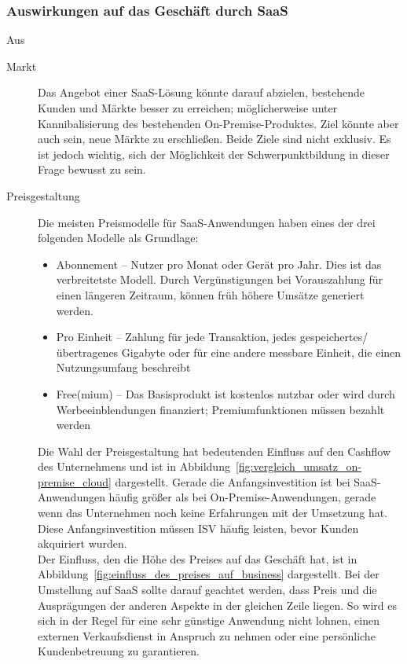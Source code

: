 \subsubsection{Auswirkungen auf das Geschäft durch SaaS}
Aus 
\begin{description}
	\item[Markt] Das Angebot einer SaaS-Lösung könnte darauf abzielen,
bestehende Kunden und Märkte besser zu erreichen; möglicherweise unter
Kannibalisierung des bestehenden On-Premise-Produktes. Ziel könnte aber auch
sein, neue Märkte zu erschließen. Beide Ziele sind nicht exklusiv. Es ist
jedoch wichtig, sich der Möglichkeit der Schwerpunktbildung in dieser Frage
bewusst zu sein.
	\item[Preisgestaltung] Die meisten Preismodelle für SaaS-Anwendungen
haben eines der drei folgenden Modelle als Grundlage:
	\begin{itemize}
		\item Abonnement -- Nutzer pro Monat oder Gerät pro Jahr. Dies
ist das verbreitetste Modell. Durch Vergünstigungen bei Vorauszahlung für einen
längeren Zeitraum, können früh höhere Umsätze generiert werden.
		\item Pro Einheit -- Zahlung für jede Transaktion, jedes
gespeichertes/übertragenes Gigabyte oder für eine andere messbare Einheit, die
einen Nutzungsumfang beschreibt
		\item Free(mium) -- Das Basisprodukt ist kostenlos nutzbar oder
wird durch Werbeeinblendungen finanziert; Premiumfunktionen müssen bezahlt
werden
	\end{itemize}
	Die Wahl der Preisgestaltung hat bedeutenden Einfluss auf den Cashflow
des Unternehmens und ist in
Abbildung~\ref{fig:vergleich_umsatz_on-premise_cloud} dargestellt. Gerade die
Anfangsinvestition ist bei SaaS-Anwendungen häufig größer als bei
On-Premise-Anwendungen, gerade wenn das Unternehmen noch keine Erfahrungen mit
der Umsetzung hat. Diese Anfangsinvestition müssen ISV häufig leisten, bevor
Kunden akquiriert wurden. \\
Der Einfluss, den die Höhe des Preises auf das Geschäft hat, ist in
Abbildung~\ref{fig:einfluss_des_preises_auf_business} dargestellt. Bei der
Umstellung auf SaaS sollte darauf geachtet werden, dass Preis und die
Ausprägungen der anderen Aspekte in der gleichen Zeile liegen. So wird es sich
in der Regel für eine sehr günstige Anwendung nicht lohnen, einen externen
Verkaufsdienst in Anspruch zu nehmen oder eine persönliche Kundenbetreuung zu
garantieren. \\



\end{description}
